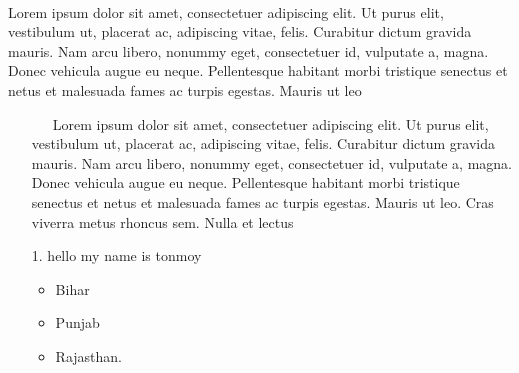 \documentclass{article}
\begin{document}
\\
\vspace{0.5cm}
Lorem ipsum dolor sit amet, consectetuer adipiscing elit. Ut purus elit,
vestibulum ut, placerat ac, adipiscing vitae, felis. Curabitur dictum gravida
mauris. Nam arcu libero, nonummy eget, consectetuer id, vulputate a, magna.
Donec vehicula augue eu neque. Pellentesque habitant morbi tristique senectus et
netus et malesuada fames ac turpis egestas. Mauris ut leo
\begin{enumerate}
    \item[]\ \ \ Lorem ipsum dolor sit amet, consectetuer adipiscing
          elit. Ut purus elit, vestibulum ut, placerat ac,
          adipiscing vitae, felis. Curabitur dictum gravida
          mauris. Nam arcu libero, nonummy eget, consectetuer
          id, vulputate a, magna. Donec vehicula augue eu neque.
          Pellentesque habitant morbi tristique senectus et netus
          et malesuada fames ac turpis egestas. Mauris ut leo.
          Cras viverra metus rhoncus sem. Nulla et lectus
    \item[1.] hello my name is tonmoy
          \begin{itemize}
              \item Bihar
              \item Punjab
              \item Rajasthan.
          \end{itemize}
\end{enumerate}
\end{document}
